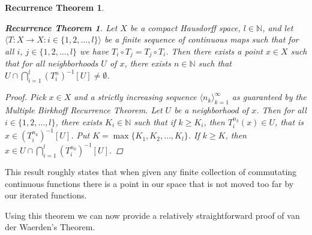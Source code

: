 \documentclass[12pt]{article}
\theoremstyle{plain}
\newtheorem{recur}[thm]{Recurrence Theorem}
\theoremstyle{definition}
\newcommand{\la}{\langle}
\newcommand{\ra}{\rangle}
\newcommand{\bbN}{\mathbb{N}}
\begin{document}
\begin{recur}
{        \begin{recur}
          Let $X$ be a compact Hausdorff space, $l \in \bbN$, and let
          $\bigl\la T
          : X \to X : i \in \{1, 2, \ldots, l\} \bigr\ra$ be a finite
          sequence of
          continuous maps such that for all $i$, $j \in \{1, 2, \ldots, l\}$
          we have $T_i \circ T_j = T_j \circ T_i$.
          Then there exists a point $x \in X$ such that for all
          neighborhoods $U$ of $x$, there exists $n \in \mathbb{N}$ such
          that $U \cap \bigcap_{i=1}^l (T_i^n)^{-1}[U] \ne \emptyset$.
        \end{recur}
        \begin{proof}
          Pick $x \in X$ and a strictly increasing sequence $\la n_k
          \ra_{k=1}^\infty$ as guaranteed by the Multiple Birkhoff
          Recurrence Theorem.
          Let $U$ be a neighborhood of $x$.
          Then for all $i \in \{1, 2, \ldots, l\}$, there exists $K_i \in
          \bbN$ such that if $k \ge K_i$, then $T_i^{n_k}(x) \in U$, that
          is $x \in (T_i^{n_k})^{-1}[U]$. 
          Put $K = \max\{K_1, K_2, \ldots, K_l\}$.
          If $k \ge K$, then $x \in U \cap \bigcap_{i=1}^l (T_i^{n_k})^{-1}[U]$.
        \end{proof}
      }
  \end{recur}

This result roughly states that when given any finite collection of
commutating continuous functions there is a point in our space that is
not moved too far by our iterated functions. 

Using this theorem we can now provide a relatively straightforward
proof of van der Waerden's Theorem. 
\end{document}
